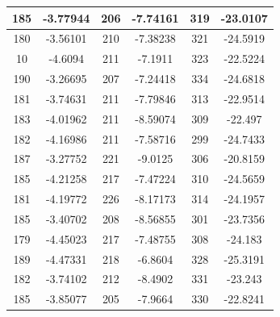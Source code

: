 \documentclass{article}
\begin{document}
\begin{tabular}{cccccc}
185&-3.77944&206&-7.74161&319&-23.0107 \\ \hline
180&-3.56101&210&-7.38238&321&-24.5919 \\ \hline
10&-4.6094&211&-7.1911&323&-22.5224 \\ \hline
190&-3.26695&207&-7.24418&334&-24.6818 \\ \hline
181&-3.74631&211&-7.79846&313&-22.9514 \\ \hline
183&-4.01962&211&-8.59074&309&-22.497 \\ \hline
182&-4.16986&211&-7.58716&299&-24.7433 \\ \hline
187&-3.27752&221&-9.0125&306&-20.8159 \\ \hline
185&-4.21258&217&-7.47224&310&-24.5659 \\ \hline
181&-4.19772&226&-8.17173&314&-24.1957 \\ \hline
185&-3.40702&208&-8.56855&301&-23.7356 \\ \hline
179&-4.45023&217&-7.48755&308&-24.183 \\ \hline
189&-4.47331&218&-6.8604&328&-25.3191 \\ \hline
182&-3.74102&212&-8.4902&331&-23.243 \\ \hline
185&-3.85077&205&-7.9664&330&-22.8241 \\ \hline
\end{tabular}
\end{document}
